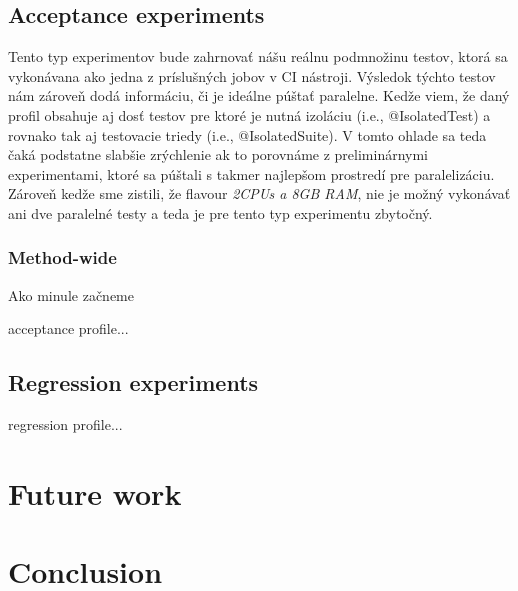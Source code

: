 
\section{Acceptance experiments}

Tento typ experimentov bude zahrnovať nášu reálnu podmnožinu testov, ktorá sa vykonávana ako jedna z príslušných jobov v CI
nástroji. Výsledok týchto testov nám zároveň dodá informáciu, či je ideálne púštať paralelne. Kedže viem, že daný profil
obsahuje aj dosť testov pre ktoré je nutná izoláciu (i.e., @IsolatedTest) a rovnako tak aj testovacie triedy (i.e., @IsolatedSuite).
V tomto ohlade sa teda čaká podstatne slabšie zrýchlenie ak to porovnáme z preliminárnymi experimentami, ktoré sa púštali
s takmer najlepšom prostredí pre paralelizáciu. Zároveň kedže sme zistili, že flavour \emph{2CPUs a 8GB RAM}, nie je
možný vykonávať ani dve paralelné testy a teda je pre tento typ experimentu zbytočný.

\subsection{Method-wide}

Ako minule začneme

acceptance profile...

\section{Regression experiments}

regression profile...

\chapter{Future work}
\label{07:chapter:title}

\chapter{Conclusion}
\label{08:chapter:title}

